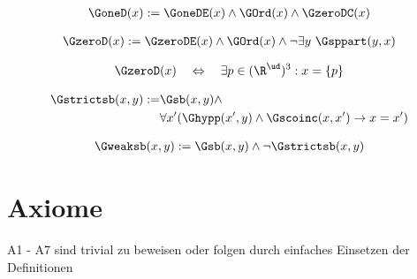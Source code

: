 \begin{erin}
    \begin{align*}
        \GoneD(x) := \GoneDE(x) \wedge \GOrd(x) \wedge \GzeroDC(x)
    \end{align*}
\end{erin}

\begin{erin}
    \begin{align*}
        \GzeroD(x) := \GzeroDE(x) \wedge \GOrd(x) \wedge \neg\exists y\ \Gsppart(y,x)
    \end{align*}
\end{erin}

\begin{hyp}\label{satz:zerod}
    \begin{align*}
        \GzeroD(x) \quad \Leftrightarrow \quad \exists p \in (\R^\ud)^3 : x = \{p\}
    \end{align*}
\end{hyp}


\begin{erin}
    \begin{align*}
        \Gstrictsb(x,y) :=
        &\Gsb(x,y) \wedge \\
        &\forall x' (\Ghypp(x',y) \wedge \Gscoinc(x,x') \to x=x')
    \end{align*}
\end{erin}

\begin{erin}
    \begin{align*}
        \Gweaksb(x,y) := \Gsb(x,y) \wedge \neg\Gstrictsb(x,y)
    \end{align*}
\end{erin}








\section{Axiome}

A1 - A7 sind trivial zu beweisen oder folgen durch einfaches Einsetzen der Definitionen


